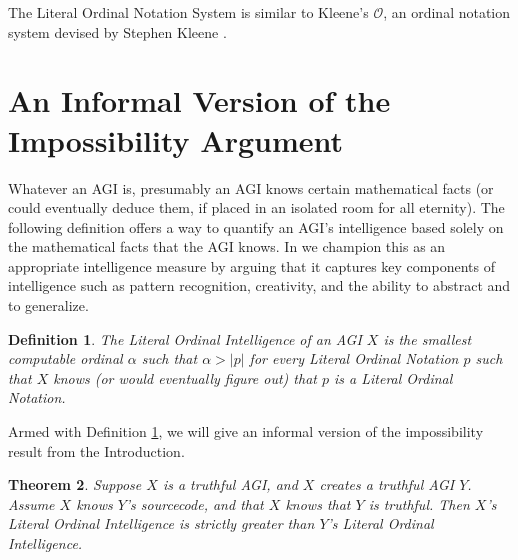 \documentclass[runningheads]{llncs}
\newtheorem{mytheorem}{Theorem}
\newtheorem{mydefinition}[mytheorem]{Definition}
\begin{document}
The Literal Ordinal Notation System is similar to Kleene's $\mathcal O$,
an ordinal notation system devised by Stephen Kleene \cite{kleene1938notation}.

\section{An Informal Version of the Impossibility Argument}
\label{informalargumentsection}

Whatever an AGI is, presumably an AGI knows certain mathematical facts
(or could eventually deduce them, if placed in an isolated room for all eternity).
The following definition offers a way to quantify an AGI's intelligence based
solely on the mathematical facts that the AGI knows. In \cite{alexander2019measuring}
we champion this as an appropriate intelligence measure by arguing that it
captures key components of intelligence such as pattern recognition, creativity, and
the ability to abstract and to generalize.

\begin{mydefinition}
\label{maindefinition}
    The \emph{Literal Ordinal Intelligence} of an AGI $X$ is the smallest computable
    ordinal $\alpha$ such that $\alpha>|p|$ for every Literal Ordinal Notation
    $p$ such that $X$ knows (or would eventually figure out) that $p$ is a
    Literal Ordinal Notation.
\end{mydefinition}

Armed with Definition \ref{maindefinition}, we will give an informal version of the
impossibility result from the Introduction.

\begin{mytheorem}
\label{maintheorem}
    Suppose $X$ is a truthful AGI, and $X$ creates a truthful AGI $Y$.
    Assume $X$ knows $Y$'s sourcecode, and that $X$ knows that $Y$ is truthful.
    Then $X$'s Literal Ordinal Intelligence is strictly greater than $Y$'s
    Literal Ordinal Intelligence.
\end{mytheorem}
\end{document}
